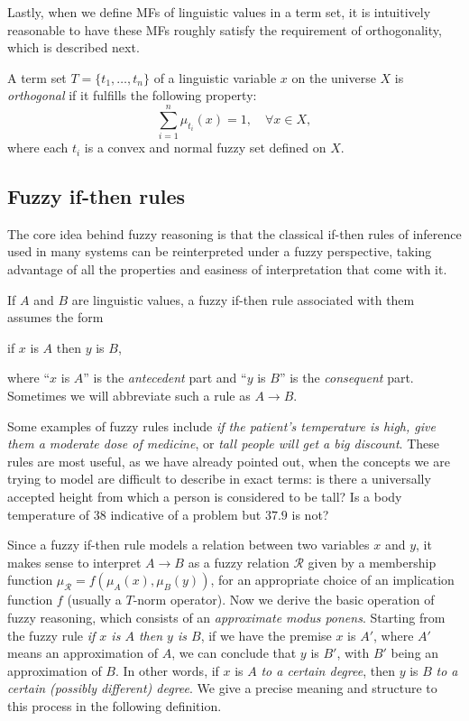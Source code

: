 Lastly, when we define MFs of linguistic values in a term set, it is intuitively reasonable to have these MFs roughly satisfy the requirement of orthogonality, which is described next.

\begin{definition}[Orthogonality] A term set $T= \{t_1, \dots, t_n\}$ of a linguistic variable $x$ on the universe $X$ is \textit{orthogonal} if it fulfills the following property:
\[
\sum_{i=1}^n \mu_{t_i}(x) = 1, \quad \forall x \in X,
\]
where each $t_i$ is a convex and normal fuzzy set defined on $X$.
\end{definition}



\subsection{Fuzzy if-then rules}

The core idea behind fuzzy reasoning is that the classical if-then rules of inference used in many systems can be reinterpreted under a fuzzy perspective, taking advantage of all the properties and easiness of interpretation that come with it.

\begin{definition} If $A$ and $B$ are linguistic values, a fuzzy if-then rule associated with them assumes the form
\begin{center}
  if $x$ is $A$ then $y$ is $B$,
\end{center}
where ``$x$ is $A$'' is the \textit{antecedent} part and ``$y$ is $B$'' is the \textit{consequent} part. Sometimes we will abbreviate such a rule as $A\to B$.
\end{definition}

Some examples of fuzzy rules include \textit{if the patient's temperature is high, give them a moderate dose of medicine}, or \textit{tall people will get a big discount}. These rules are most useful, as we have already pointed out, when the concepts we are trying to model are difficult to describe in exact terms: is there a universally accepted height from which a person is considered to be tall? Is a body temperature of 38\textdegree{} indicative of a problem but $37.9$\textdegree{} is not?

Since a fuzzy if-then rule models a relation between two variables $x$ and $y$, it makes sense to interpret $A\to B$ as a fuzzy relation $\mathcal R$ given by a membership function $\mu_{\mathcal R} = f(\mu_A(x), \mu_B(y))$, for an appropriate choice of an implication function $f$ (usually a $T$-norm operator). Now we derive the basic operation of fuzzy reasoning, which consists of an \textit{approximate modus ponens}. Starting from the fuzzy rule \textit{if $x$ is $A$ then $y$ is $B$}, if we have the premise $x$ is $A'$, where $A'$ means an approximation of $A$, we can conclude that $y$ is $B'$, with $B'$ being an approximation of $B$. In other words, if $x$ is $A$ \textit{to a certain degree}, then $y$ is $B$ \textit{to a certain (possibly different) degree}. We give a precise meaning and structure to this process in the following definition.

